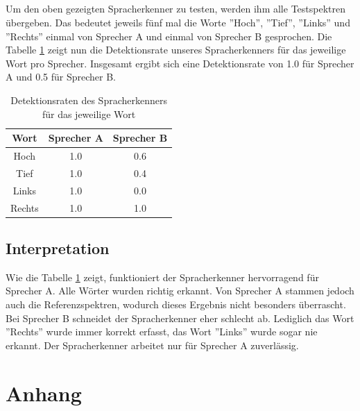 \documentclass[12pt,oneside,a4paper]{report}
\begin{document}
\paragraph{}

Um den oben gezeigten Spracherkenner zu testen, werden ihm alle Testspektren übergeben. Das bedeutet jeweils fünf mal die Worte ''Hoch'', ''Tief'', ''Links'' und ''Rechts'' einmal von Sprecher A und einmal von Sprecher B gesprochen.
Die Tabelle \ref{tab:DETEKTIONSRATE} zeigt nun die Detektionsrate unseres Spracherkenners für das jeweilige Wort pro Sprecher. Insgesamt ergibt sich eine Detektionsrate von 1.0 für Sprecher A und 0.5 für Sprecher B.

\begin{table}[H]
\centering 
\begin{tabular}{ccc}
\hline
\textbf{Wort} &\textbf{Sprecher A} & \textbf{Sprecher B} \\
\hline
Hoch & 1.0 & 0.6 \\
\hline
Tief & 1.0 & 0.4 \\
\hline
Links & 1.0 & 0.0 \\
\hline
Rechts & 1.0 & 1.0 \\
\hline
\end{tabular} 
\caption{Detektionsraten des Spracherkenners für das jeweilige Wort}
\label{tab:DETEKTIONSRATE}
\end{table}

\section{Interpretation}
\label{chap:VERSUCH_2_INTERPRETATION}

Wie die Tabelle \ref{tab:DETEKTIONSRATE} zeigt, funktioniert der Spracherkenner hervorragend für Sprecher A. Alle Wörter wurden richtig erkannt. Von Sprecher A stammen jedoch auch die Referenzspektren, wodurch dieses Ergebnis nicht besonders überrascht.
Bei Sprecher B schneidet der Spracherkenner eher schlecht ab. Lediglich das Wort ''Rechts'' wurde immer korrekt erfasst, das Wort ''Links'' wurde sogar nie erkannt.
Der Spracherkenner arbeitet nur für Sprecher A zuverlässig.

%
%
\renewcommand\thesection{A.\arabic{section}}
\renewcommand\thesubsection{\thesection.\arabic{subsection}}

\chapter*{Anhang}
\label{chap:APPENDIX}
\addtocounter{chapter}{1}
\setcounter{section}{0}
\end{document}
